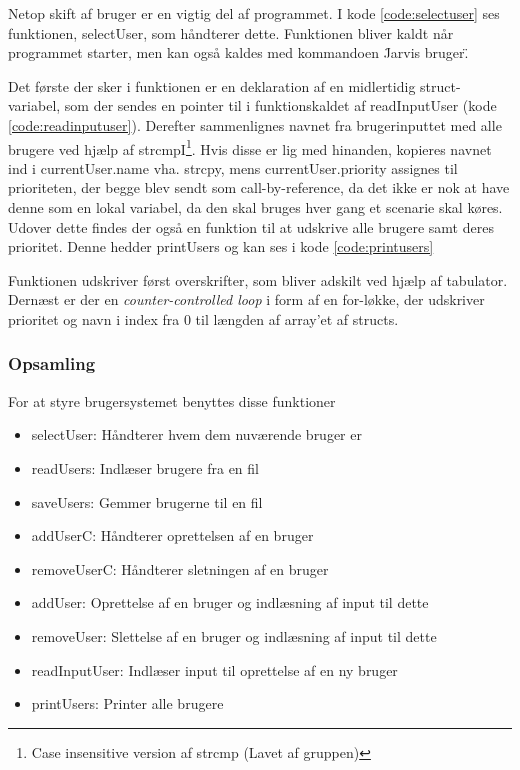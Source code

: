 Netop skift af bruger er en vigtig del af programmet. I kode \ref{code:selectuser} ses funktionen, selectUser, som håndterer dette. Funktionen bliver kaldt når programmet starter, men kan også kaldes med kommandoen \"Jarvis bruger\". 



Det første der sker i funktionen er en deklaration af en midlertidig struct-variabel, som der sendes en pointer til i funktionskaldet af readInputUser (kode \ref{code:readinputuser}). Derefter sammenlignes navnet fra brugerinputtet med alle brugere ved hjælp af strcmpI\footnote{Case insensitive version af strcmp (Lavet af gruppen)}. Hvis disse er lig med hinanden, kopieres navnet ind i currentUser.name vha. strcpy, mens currentUser.priority assignes til prioriteten, der begge blev sendt som call-by-reference, da det ikke er nok at have denne som en lokal variabel, da den skal bruges hver gang et scenarie skal køres.\\

Udover dette findes der også en funktion til at udskrive alle brugere samt deres prioritet. Denne hedder printUsers og kan ses i kode \ref{code:printusers}


Funktionen udskriver først overskrifter, som bliver adskilt ved hjælp af tabulator. Dernæst er der en \textit{counter-controlled loop} i form af en for-løkke, der udskriver prioritet og navn i index fra 0 til længden af array'et af structs.

\subsubsection*{Opsamling}
For at styre brugersystemet benyttes disse funktioner
\begin{itemize}
    \item selectUser: Håndterer hvem dem nuværende bruger er
    \item readUsers: Indlæser brugere fra en fil
    \item saveUsers: Gemmer brugerne til en fil
    \item addUserC: Håndterer oprettelsen af en bruger
    \item removeUserC: Håndterer sletningen af en bruger
    \item addUser: Oprettelse af en bruger og indlæsning af input til dette
    \item removeUser: Slettelse af en bruger og indlæsning af input til dette
    \item readInputUser: Indlæser input til oprettelse af en ny bruger
    \item printUsers: Printer alle brugere
\end{itemize}

